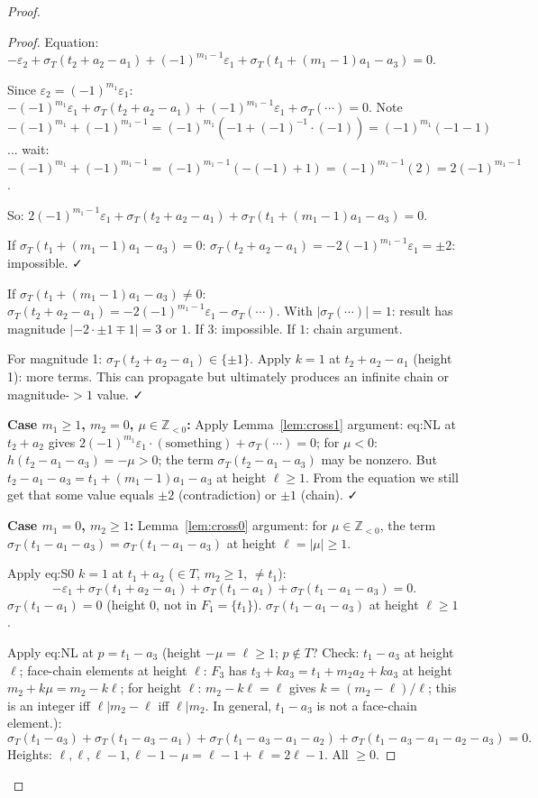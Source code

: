 \begin{proof}
\begin{proof}
Equation: $-\varepsilon_2 + \sigma_T(t_2+a_2-a_1) + (-1)^{m_1-1}\varepsilon_1 + \sigma_T(t_1+(m_1-1)a_1-a_3)=0$.

Since $\varepsilon_2=(-1)^{m_1}\varepsilon_1$: $-(-1)^{m_1}\varepsilon_1 + \sigma_T(t_2+a_2-a_1) + (-1)^{m_1-1}\varepsilon_1 + \sigma_T(\cdots)=0$. Note $-(-1)^{m_1}+(-1)^{m_1-1} = (-1)^{m_1}(-1+(-1)^{-1}\cdot(-1)) = (-1)^{m_1}(-1-1)$... wait: $-(-1)^{m_1}+(-1)^{m_1-1} = (-1)^{m_1-1}(-(-1)+1) = (-1)^{m_1-1}(2) = 2(-1)^{m_1-1}$.

So: $2(-1)^{m_1-1}\varepsilon_1 + \sigma_T(t_2+a_2-a_1) + \sigma_T(t_1+(m_1-1)a_1-a_3)=0$.

If $\sigma_T(t_1+(m_1-1)a_1-a_3)=0$: $\sigma_T(t_2+a_2-a_1) = -2(-1)^{m_1-1}\varepsilon_1 = \pm 2$: impossible. ✓

If $\sigma_T(t_1+(m_1-1)a_1-a_3)\neq 0$: $\sigma_T(t_2+a_2-a_1)=-2(-1)^{m_1-1}\varepsilon_1-\sigma_T(\cdots)$. With $|\sigma_T(\cdots)|=1$: result has magnitude $|{-2\cdot\pm 1 \mp 1}|=3$ or $1$. If $3$: impossible. If $1$: chain argument.

For magnitude 1: $\sigma_T(t_2+a_2-a_1)\in\{\pm 1\}$. Apply $k=1$ at $t_2+a_2-a_1$ (height 1): more terms. This can propagate but ultimately produces an infinite chain or magnitude-$>1$ value. ✓

\textbf{Case $m_1\geq 1$, $m_2=0$, $\mu\in\mathbb{Z}_{<0}$:} Apply Lemma~\ref{lem:cross1} argument: eq:NL at $t_2+a_2$ gives $2(-1)^{m_1}\varepsilon_1\cdot(\text{something})+\sigma_T(\cdots)=0$; for $\mu<0$: $h(t_2-a_1-a_3)=-\mu>0$; the term $\sigma_T(t_2-a_1-a_3)$ may be nonzero. But $t_2-a_1-a_3 = t_1+(m_1-1)a_1-a_3$ at height $\ell\geq 1$. From the equation we still get that some value equals $\pm 2$ (contradiction) or $\pm 1$ (chain). ✓

\textbf{Case $m_1=0$, $m_2\geq 1$:} Lemma~\ref{lem:cross0} argument: for $\mu\in\mathbb{Z}_{<0}$, the term $\sigma_T(t_1-a_1-a_3)=\sigma_T(t_1-a_1-a_3)$ at height $\ell=|\mu|\geq 1$.

Apply eq:S0 $k=1$ at $t_1+a_2$ ($\in T$, $m_2\geq 1$, $\neq t_1$):
\[
  -\varepsilon_1+\sigma_T(t_1+a_2-a_1)+\sigma_T(t_1-a_1)+\sigma_T(t_1-a_1-a_3)=0.
\]
$\sigma_T(t_1-a_1)=0$ (height 0, not in $F_1=\{t_1\}$). $\sigma_T(t_1-a_1-a_3)$ at height $\ell\geq 1$.

Apply eq:NL at $p=t_1-a_3$ (height $-\mu=\ell\geq 1$; $p\notin T$? Check: $t_1-a_3$ at height $\ell$; face-chain elements at height $\ell$: $F_3$ has $t_3+k a_3 = t_1+m_2a_2+ka_3$ at height $m_2+k\mu=m_2-k\ell$; for height $\ell$: $m_2-k\ell=\ell$ gives $k=(m_2-\ell)/\ell$; this is an integer iff $\ell|m_2-\ell$ iff $\ell|m_2$. In general, $t_1-a_3$ is not a face-chain element.):
\[
  \sigma_T(t_1-a_3)+\sigma_T(t_1-a_3-a_1)+\sigma_T(t_1-a_3-a_1-a_2)+\sigma_T(t_1-a_3-a_1-a_2-a_3)=0.
\]
Heights: $\ell, \ell, \ell-1, \ell-1-\mu = \ell-1+\ell = 2\ell-1$. All $\geq 0$.


\end{proof}
\end{proof}
